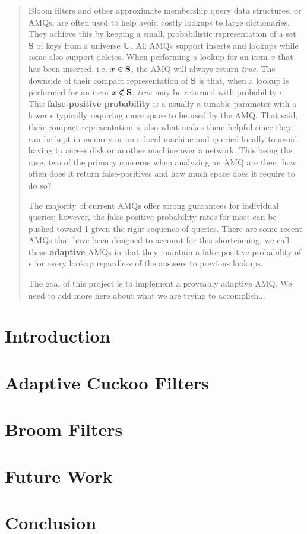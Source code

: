 \documentclass[11pt]{article}
\begin{document}
\maketitle

\begin{abstract}
	Bloom filters and other approximate membership query data structures, or AMQs, are often used to help avoid costly lookups to large dictionaries.  They achieve this by keeping a small, probabilistic representation of a set {\bf S} of keys from a universe {\bf U}.  All AMQs support inserts and lookups while some also support deletes.  When performing a lookup for an item $x$ that has been inserted, i.e. $x\in {\bf S}$, the AMQ will always return {\it true}.  The downside of their compact representation of {\bf S} is that, when a lookup is performed for an item $x \notin {\bf S}$, {\it true} may be returned with probability $\epsilon$.  This {\bf false-positive probability} is a usually a tunable parameter with a lower $\epsilon$ typically requiring more space to be used by the AMQ.  That said, their compact representation is also what makes them helpful since they can be kept in memory or on a local machine and queried locally to avoid having to access disk or another machine over a network.  This being the case, two of the primary concerns when analyzing an AMQ are then, how often does it return false-positives and how much space does it require to do so?

	The majority of current AMQs offer strong guarantees for individual queries; however, the false-positive probability rates for most can be pushed toward 1 given the right sequence of queries.  There are some recent AMQs that have been designed to account for this shortcoming, we call these {\bf adaptive} AMQs in that they maintain a false-positive probability of $\epsilon$ for every lookup regardless of the answers to previous lookups.

	The goal of this project is to implement a proveably adaptive AMQ.  We need to add more here about what we are trying to accomplish...
\end{abstract}

\section{Introduction}



\section{Adaptive Cuckoo Filters}

\section{Broom Filters}

\section{Future Work}

\section{Conclusion}




\end{document}
